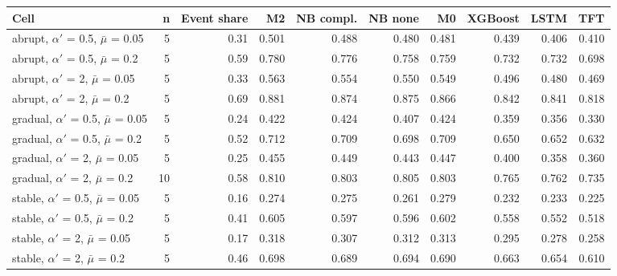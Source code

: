 \documentclass[10pt,a4paper]{article}
\begin{document}
\noindent\begin{minipage}{\linewidth}
\label{tab:S3a}
\centering\footnotesize
\begin{tabular}{lrrrrrrrrr}
\toprule
Cell & n & Event share & M2 & NB compl. & NB none & M0 & XGBoost & LSTM & TFT \\ \midrule
abrupt, $\alpha'$ = 0.5, $\bar{\mu}$ = 0.05 & 5 & 0.31 & 0.501 & 0.488 & 0.480 & 0.481 & 0.439 & 0.406 & 0.410 \\
abrupt, $\alpha'$ = 0.5, $\bar{\mu}$ = 0.2 & 5 & 0.59 & 0.780 & 0.776 & 0.758 & 0.759 & 0.732 & 0.732 & 0.698 \\
abrupt, $\alpha'$ = 2, $\bar{\mu}$ = 0.05 & 5 & 0.33 & 0.563 & 0.554 & 0.550 & 0.549 & 0.496 & 0.480 & 0.469 \\
abrupt, $\alpha'$ = 2, $\bar{\mu}$ = 0.2 & 5 & 0.69 & 0.881 & 0.874 & 0.875 & 0.866 & 0.842 & 0.841 & 0.818 \\
gradual, $\alpha'$ = 0.5, $\bar{\mu}$ = 0.05 & 5 & 0.24 & 0.422 & 0.424 & 0.407 & 0.424 & 0.359 & 0.356 & 0.330 \\
gradual, $\alpha'$ = 0.5, $\bar{\mu}$ = 0.2 & 5 & 0.52 & 0.712 & 0.709 & 0.698 & 0.709 & 0.650 & 0.652 & 0.632 \\
gradual, $\alpha'$ = 2, $\bar{\mu}$ = 0.05 & 5 & 0.25 & 0.455 & 0.449 & 0.443 & 0.447 & 0.400 & 0.358 & 0.360 \\
gradual, $\alpha'$ = 2, $\bar{\mu}$ = 0.2 & 10 & 0.58 & 0.810 & 0.803 & 0.805 & 0.803 & 0.765 & 0.762 & 0.735 \\
stable, $\alpha'$ = 0.5, $\bar{\mu}$ = 0.05 & 5 & 0.16 & 0.274 & 0.275 & 0.261 & 0.279 & 0.232 & 0.233 & 0.225 \\
stable, $\alpha'$ = 0.5, $\bar{\mu}$ = 0.2 & 5 & 0.41 & 0.605 & 0.597 & 0.596 & 0.602 & 0.558 & 0.552 & 0.518 \\
stable, $\alpha'$ = 2, $\bar{\mu}$ = 0.05 & 5 & 0.17 & 0.318 & 0.307 & 0.312 & 0.313 & 0.295 & 0.278 & 0.258 \\
stable, $\alpha'$ = 2, $\bar{\mu}$ = 0.2 & 5 & 0.46 & 0.698 & 0.689 & 0.694 & 0.690 & 0.663 & 0.654 & 0.610 \\
\bottomrule
\end{tabular}
\end{minipage}
\vspace{22pt}
\end{document}
